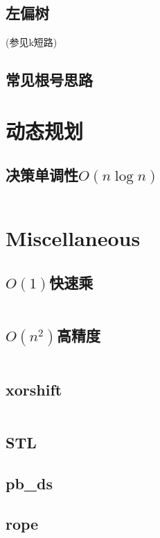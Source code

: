 \documentclass[a4paper]{article}
\begin{document}
\begin{multicols}{2}
				\subsection{左偏树}
					(参见k短路)

				\subsection{常见根号思路}
					

			\section{动态规划}
				\subsection{决策单调性$O(n\log n)$}
					\inputminted{cpp}{../src/DP/决策单调性.cpp}

			\section{Miscellaneous}
				\subsection{$O(1)$快速乘}
					\inputminted{cpp}{../src/misc/O(1)快速乘.cpp}
				
				\subsection{$O(n^2)$高精度}
					\inputminted{cpp}{../src/misc/高精度.cpp}

				\subsection{xorshift}
					\inputminted{cpp}{../src/misc/xorshift.cpp}
					
				\subsection{STL}
					

				\subsection{pb\_ds}


				\subsection{rope}


\end{multicols}
\end{document}
